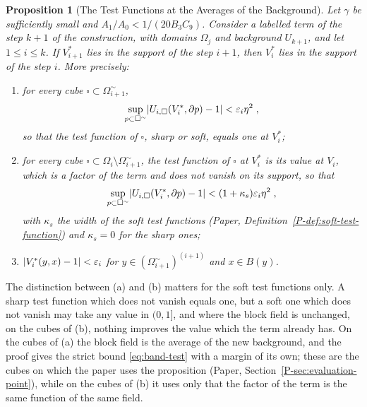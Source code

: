 \documentclass[11pt]{preprint}
\DeclarePairedDelimiter{\abs}{\lvert}{\rvert}
\numberwithin{equation}{section}
\newtheorem{proposition}{Proposition}
\theoremstyle{definition}
\theoremstyle{remark}
\theoremstyle{plain}
\begin{document}
\begin{proposition}[The Test Functions at the Averages of the Background]\label{prop:band}
Let $\gamma$ be sufficiently small and $A_1/A_0 < 1/(20B_3C_9)$. Consider a labelled term of the step $k + 1$ of the construction, with domains $\Omega_j$ and background $U_{k+1}$, and let $1 \leq i \leq k$. If $V^*_{i+1}$ lies in the support of the step $i + 1$, then $V^*_i$ lies in the support of the step $i$. More precisely:
\begin{enumerate}[label=(\alph*)]
\item for every cube $\square \subset \Omega_{i+1}^\sim$,
\begin{equation}\label{eq:band-test}
    \sup_{p \subset \square^\sim}\abs{U_{i,\square}(V^*_i, \partial p) - 1} < \varepsilon_i\eta^2\;,
\end{equation}
so that the test function of $\square$, sharp or soft, equals one at $V^*_i$;
\item for every cube $\square \subset \Omega_i \setminus \Omega_{i+1}^\sim$, the test function of $\square$ at $V^*_i$ is its value at $V_i$, which is a factor of the term and does not vanish on its support, so that
\begin{equation}\label{eq:band-support}
    \sup_{p \subset \square^\sim}\abs{U_{i,\square}(V^*_i, \partial p) - 1} < (1 + \kappa_s)\varepsilon_i\eta^2\;,
\end{equation}
with $\kappa_s$ the width of the soft test functions (Paper, Definition~\ref{P-def:soft-test-function}) and $\kappa_s = 0$ for the sharp ones;
\item $\abs{V^*_i(y, x) - 1} < \varepsilon_i$ for $y \in (\Omega_{i+1}^\sim)^{(i+1)}$ and $x \in B(y)$.
\end{enumerate}
\end{proposition}

The distinction between (a) and (b) matters for the soft test functions only. A sharp test function which does not vanish equals one, but a soft one which does not vanish may take any value in $(0, 1]$, and where the block field is unchanged, on the cubes of (b), nothing improves the value which the term already has. On the cubes of (a) the block field is the average of the new background, and the proof gives the strict bound \eqref{eq:band-test} with a margin of its own; these are the cubes on which the paper uses the proposition (Paper, Section~\ref{P-sec:evaluation-point}), while on the cubes of (b) it uses only that the factor of the term is the same function of the same field.
\end{document}
